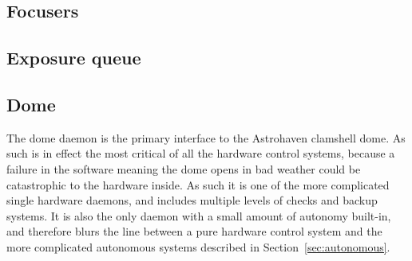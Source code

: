 \begin{colsection}

\subsection{Focusers}
\label{sec:filt}
\begin{colsection}
\end{colsection}


\subsection{Exposure queue}
\label{sec:exq}
\begin{colsection}
\end{colsection}


\subsection{Dome}
\label{sec:dome}
\begin{colsection}

The dome daemon is the primary interface to the Astrohaven clamshell dome. As such is in effect the most critical of all the hardware control systems, because a failure in the software meaning the dome opens in bad weather could be catastrophic to the hardware inside. As such it is one of the more complicated single hardware daemons, and includes multiple levels of checks and backup systems. It is also the only daemon with a small amount of autonomy built-in, and therefore blurs the line between a pure hardware control system and the more complicated autonomous systems described in Section~\ref{sec:autonomous}.


\end{colsection}
\end{colsection}

